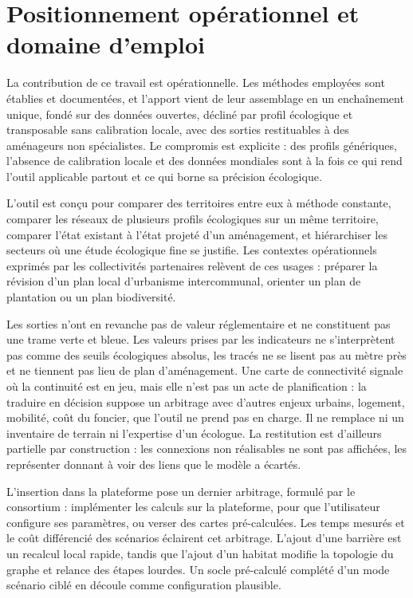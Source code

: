 \documentclass[a4paper,12pt]{report}
\begin{document}
\section{Positionnement opérationnel et domaine d'emploi}
La contribution de ce travail est opérationnelle. Les méthodes employées sont établies et documentées, et l'apport vient de leur assemblage en un enchaînement unique, fondé sur des données ouvertes, décliné par profil écologique et transposable sans calibration locale, avec des sorties restituables à des aménageurs non spécialistes. Le compromis est explicite : des profils génériques, l'absence de calibration locale et des données mondiales sont à la fois ce qui rend l'outil applicable partout et ce qui borne sa précision écologique.
 
L'outil est conçu pour comparer des territoires entre eux à méthode constante, comparer les réseaux de plusieurs profils écologiques sur un même territoire, comparer l'état existant à l'état projeté d'un aménagement, et hiérarchiser les secteurs où une étude écologique fine se justifie. Les contextes opérationnels exprimés par les collectivités partenaires relèvent de ces usages : préparer la révision d'un plan local d'urbanisme intercommunal, orienter un plan de plantation ou un plan biodiversité.
 
Les sorties n'ont en revanche pas de valeur réglementaire et ne constituent pas une trame verte et bleue. Les valeurs prises par les indicateurs ne s'interprètent pas comme des seuils écologiques absolus, les tracés ne se lisent pas au mètre près et ne tiennent pas lieu de plan d'aménagement. Une carte de connectivité signale où la continuité est en jeu, mais elle n'est pas un acte de planification : la traduire en décision suppose un arbitrage avec d'autres enjeux urbains, logement, mobilité, coût du foncier, que l'outil ne prend pas en charge. Il ne remplace ni un inventaire de terrain ni l'expertise d'un écologue. La restitution est d'ailleurs partielle par construction : les connexions non réalisables ne sont pas affichées, les représenter donnant à voir des liens que le modèle a écartés.
 
L'insertion dans la plateforme pose un dernier arbitrage, formulé par le consortium : implémenter les calculs sur la plateforme, pour que l'utilisateur configure ses paramètres, ou verser des cartes pré-calculées. Les temps mesurés et le coût différencié des scénarios éclairent cet arbitrage. L'ajout d'une barrière est un recalcul local rapide, tandis que l'ajout d'un habitat modifie la topologie du graphe et relance des étapes lourdes. Un socle pré-calculé complété d'un mode scénario ciblé en découle comme configuration plausible.
\end{document}
